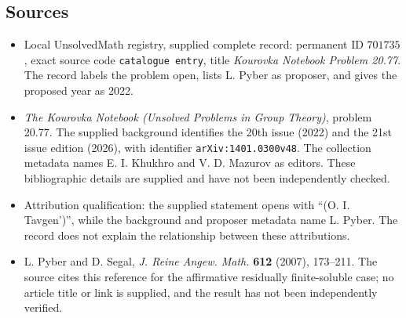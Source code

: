 \documentclass[11pt]{article}
\begin{document}
\subsection{Sources}
\begin{itemize}
\item Local UnsolvedMath registry, supplied complete record: permanent ID \(701735\), exact source code \texttt{catalogue entry}, title \emph{Kourovka Notebook Problem 20.77}. The record labels the problem open, lists L. Pyber as proposer, and gives the proposed year as 2022.
\item \emph{The Kourovka Notebook (Unsolved Problems in Group Theory)}, problem 20.77. The supplied background identifies the 20th issue (2022) and the 21st issue edition (2026), with identifier \texttt{arXiv:1401.0300v48}. The collection metadata names E. I. Khukhro and V. D. Mazurov as editors. These bibliographic details are supplied and have not been independently checked.
\item Attribution qualification: the supplied statement opens with ``(O. I. Tavgen')'', while the background and proposer metadata name L. Pyber. The record does not explain the relationship between these attributions.
\item L. Pyber and D. Segal, \emph{J. Reine Angew. Math.} \textbf{612} (2007), 173--211. The source cites this reference for the affirmative residually finite-soluble case; no article title or link is supplied, and the result has not been independently verified.
\end{itemize}
\end{document}
